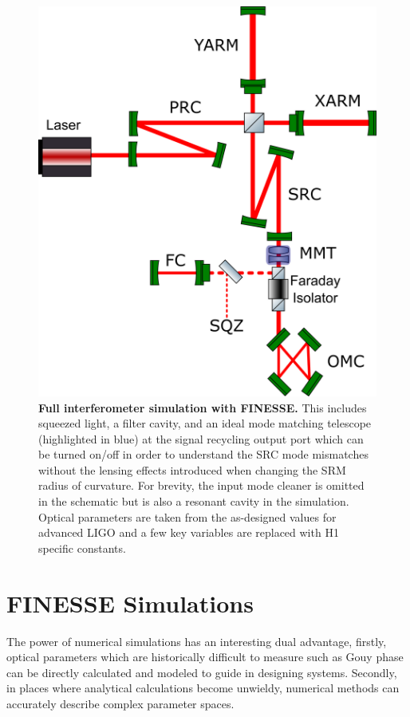 \begin{figure}[ht!]
	\centering
	\includegraphics[width=0.8 \textwidth]{../Figures/FullIFO_FINESSE.png}
	\caption[Full interferometer simulation with FINESSE.]
	{\textbf{Full interferometer simulation with FINESSE.} 
		This includes squeezed light, a filter cavity, and an ideal mode matching telescope (highlighted in blue) at the signal recycling output port which can be turned on/off in order to understand the SRC mode mismatches without the lensing effects introduced when changing the SRM radius of curvature.  For brevity, the input mode cleaner is omitted in the schematic but is also a resonant cavity in the simulation.  Optical parameters are taken from the as-designed values for advanced LIGO and a few key variables are replaced with H1 specific constants.
	}
	\label{fig:IFO_FINESSE}
\end{figure}

	\section{FINESSE Simulations}
	The power of numerical simulations has an interesting dual advantage, firstly, optical parameters which are historically difficult to measure such as Gouy phase can be directly calculated and modeled to guide in designing systems. Secondly, in places where analytical calculations become unwieldy, numerical methods can accurately describe complex parameter spaces.
		

